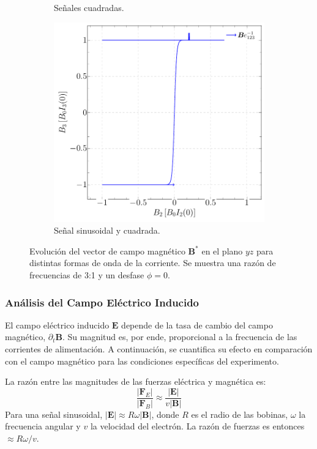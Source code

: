\begin{figure}[htbp!]
\begin{subfigure}{0.32\linewidth}
		\caption{Señales cuadradas.}
		\label{fig:b_sqr_sqr}
	\end{subfigure}
	\hfill
	\begin{subfigure}{0.32\linewidth}
		\includegraphics[width=\linewidth]{../Figures/Uniform-Field/B-sin-square.pdf}
		\caption{Señal sinusoidal y cuadrada.}
		\label{fig:b_sin_sqr}
	\end{subfigure}
	\caption{Evolución del vector de campo magnético $\boldsymbol{B}^*$ en
		el plano $yz$ para distintas formas de onda de la corriente. Se
	muestra una razón de frecuencias de 3:1 y un desfase $\phi=0$.}
	\label{fig:B_fields}
\end{figure}

\subsubsection{Análisis del Campo Eléctrico Inducido}
\label{sssec:dinamica_e}

El campo eléctrico inducido $\boldsymbol{E}$ depende de la tasa de cambio
del campo magnético, $\partial_t \boldsymbol{B}$. Su magnitud es, por
ende, proporcional a la frecuencia de las corrientes de alimentación.
A continuación, se cuantifica su efecto en comparación con el campo
magnético para las condiciones específicas del experimento.

La razón entre las magnitudes de las fuerzas eléctrica y magnética es:
%
$$
\frac{|\boldsymbol{F}_E|}{|\boldsymbol{F}_B|} \approx
\frac{|\boldsymbol{E}|}{v |\boldsymbol{B}|}
$$
%
Para una señal sinusoidal, $|\boldsymbol{E}| \approx R \omega |\boldsymbol{B}|$,
donde $R$ es el radio de las bobinas, $\omega$ la frecuencia angular y $v$
la velocidad del electrón. La razón de fuerzas es entonces $\approx R\omega/v$.

